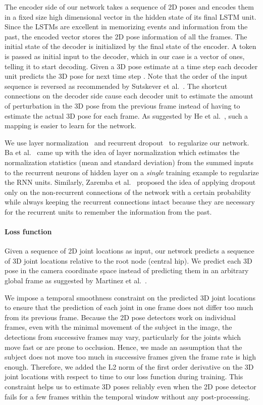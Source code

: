 \documentclass[runningheads]{llncs}
\begin{document}
The encoder side of our network takes a sequence of 2D poses and encodes them in a fixed size high dimensional vector in the hidden state of its final LSTM unit. Since the LSTMs are excellent in memorizing events and information from the past, the encoded vector stores the 2D pose information of all the frames. The initial state of the decoder is initialized by the final state of the encoder. A  token is passed as initial input to the decoder, which in our case is a vector of ones, telling it to start decoding. Given a 3D pose estimate  at a time step  each decoder unit predicts the 3D pose for next time step . Note that the order of the input sequence is reversed as recommended by Sutskever et al.~\cite{sutskever2014sequence}. The shortcut connections on the decoder side cause each decoder unit to estimate the amount of perturbation in the 3D pose from the previous frame instead of having to estimate the actual 3D pose for each frame. As suggested by He et al.~\cite{he2016deep}, such a mapping is easier to learn for the network.

We use layer normalization~\cite{ba2016layer} and recurrent dropout~\cite{zaremba2014recurrent} to regularize our network. Ba et al.~\cite{ba2016layer} came up with the idea of layer normalization which estimates the normalization statistics (mean and standard deviation) from the summed inputs to the recurrent neurons of hidden layer on a \emph{single} training example to regularize the RNN units. Similarly, Zaremba et al.~\cite{zaremba2014recurrent} proposed the idea of applying dropout only on the non-recurrent connections of the network with a certain probability  while always keeping the recurrent connections intact because they are necessary for the recurrent units to remember the information from the past.  
\vspace{-5mm}
\paragraph{Loss function}
Given a sequence of 2D joint locations as input, our network predicts a sequence of 3D joint locations relative to the root node (central hip). We predict each 3D pose in the camera coordinate space instead of predicting them in an arbitrary global frame as suggested by Martinez et al.~\cite{JMartinez:ICCV:2017}.

We impose a temporal smoothness constraint on the predicted 3D joint locations to ensure that the prediction of each joint in one frame does not differ too much from its previous frame. Because the 2D pose detectors work on individual frames, even with the minimal movement of the subject in the image, the detections from successive frames may vary, particularly for the joints which move fast or are prone to occlusion. Hence, we made an assumption that the subject does not move too much in successive frames given the frame rate is high enough. Therefore, we added the L2 norm of the first order derivative on the 3D joint locations with respect to time to our loss function during training. This constraint helps us to estimate 3D poses reliably even when the 2D pose detector fails for a few frames within the temporal window without any post-processing.
\end{document}
